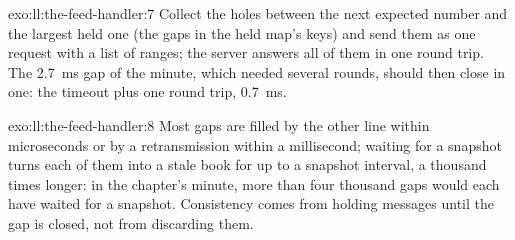 \begin{solution}{exo:ll:the-feed-handler:7}
Collect the holes between the next expected number and the largest held one (the gaps in the held map's keys) and send them
as one request with a list of ranges; the server answers all of them in one round trip. The \qty{2.7}{\milli\second} gap of the
minute, which needed several rounds, should then close in one: the timeout plus one round trip, \qty{0.7}{\milli\second}.
\end{solution}

\begin{solution}{exo:ll:the-feed-handler:8}
Most gaps are filled by the other line within microseconds or by a retransmission within a millisecond; waiting for a snapshot
turns each of them into a stale book for up to a snapshot interval, a thousand times longer: in the chapter's minute, more
than four thousand gaps would each have waited for a snapshot. Consistency comes from holding messages until the gap is closed, not from discarding them.
\end{solution}

